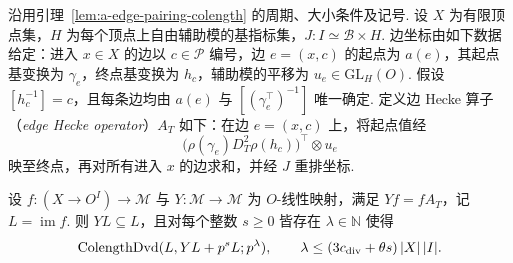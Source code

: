\begin{theorem}
\label{thm:a-edge-elementary-divisors}
\emitthmsource
沿用引理~\ref{lem:a-edge-pairing-colength} 的周期、大小条件及记号. 设 $X$ 为有限顶点集，$H$ 为每个顶点上自由辅助模的基指标集，$J:I\simeq\mathcal B\times H$. 边坐标由如下数据给定：进入 $x\in X$ 的边以 $c\in\mathcal P$ 编号，边 $e=(x,c)$ 的起点为 $a(e)$，其起点基变换为 $\gamma_e$，终点基变换为 $h_c$，辅助模的平移为 $u_e\in\mathrm{GL}_H(O)$. 假设 $[h_c^{-1}]=c$，且每条边均由 $a(e)$ 与 $[(\gamma_e^\top)^{-1}]$ 唯一确定. 定义边 Hecke 算子（\emph{edge Hecke operator}）$A_T$ 如下：在边 $e=(x,c)$ 上，将起点值经
\[
 \bigl(\rho(\gamma_e)D_T^2\rho(h_c)\bigr)^\top\otimes u_e
\]
映至终点，再对所有进入 $x$ 的边求和，并经 $J$ 重排坐标.

设 $f:(X\to O^I)\to\mathcal M$ 与 $Y:\mathcal M\to\mathcal M$ 为 $O$-线性映射，满足 $Yf=fA_T$，记 $L=\operatorname{im}f$. 则 $YL\subseteq L$，且对每个整数 $s\ge0$ 皆存在 $\lambda\in\mathbb N$ 使得
\[
 \operatorname{ColengthDvd}(L,YL+p^sL;p^\lambda),
 \qquad
 \lambda\le (3c_{\rm div}+\theta s)\,|X|\,|I|.
\]
\end{theorem}
